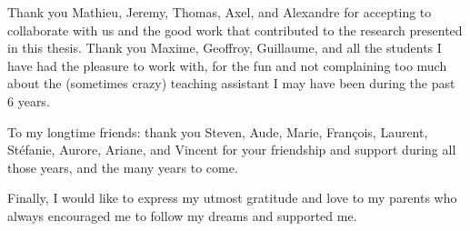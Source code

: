 Thank you Mathieu, Jeremy, Thomas, Axel, and Alexandre for accepting to collaborate with us and the good work that contributed to the research presented in this thesis. Thank you Maxime, Geoffroy, Guillaume, and all the students I have had the pleasure to work with, for the fun and not complaining too much about the (sometimes crazy) teaching assistant I may have been during the past 6 years.

To my longtime friends: thank you Steven, Aude, Marie, François, Laurent, Stéfanie, Aurore, Ariane, and Vincent for your friendship and support during all those years, and the many years to come.

Finally, I would like to express my utmost gratitude and love to my parents who always encouraged me to follow my dreams and supported me.

